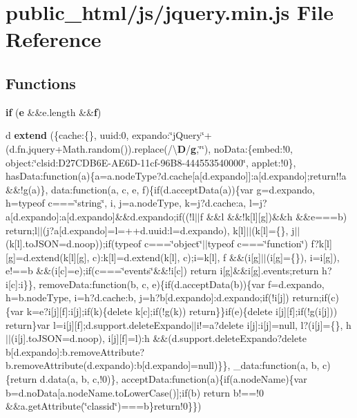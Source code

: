 \section{public\-\_\-html/js/jquery.min.\-js File Reference}
\label{jquery_8min_8js}
\subsection*{Functions}
\begin{DoxyCompactItemize}
\item 
{\bf if} ({\bf e} \&\&e.\-length \&\&{\bf f})
\item 
d {\bf extend} (\{cache\-:\{\}, uuid\-:0, expando\-:\char`\"{}j\-Query\char`\"{}+(d.\-fn.\-jquery+Math.\-random()).replace(/\textbackslash{}{\bf D}/{\bf g},\char`\"{}\char`\"{}), no\-Data\-:\{embed\-:!0, object\-:\char`\"{}clsid\-:\-D27\-C\-D\-B6\-E-\/A\-E6\-D-\/11cf-\/96\-B8-\/444553540000\char`\"{}, applet\-:!0\}, has\-Data\-:function(a)\{a=a.\-node\-Type?d.\-cache[a[d.\-expando]]\-:a[d.\-expando];return!!a \&\&!g(a)\}, data\-:function(a, c, e, f)\{if(d.\-accept\-Data(a))\{var g=d.\-expando, h=typeof c===\char`\"{}string\char`\"{}, i, j=a.\-node\-Type, k=j?d.\-cache\-:a, l=j?a[d.\-expando]\-:a[d.\-expando]\&\&d.\-expando;if((!l$|$$|$f \&\&l \&\&!k[l][g])\&\&h \&\&e===b) return;l$|$$|$(j?a[d.\-expando]=l=++d.\-uuid\-:l=d.\-expando), k[l]$|$$|$(k[l]=\{\}, j$|$$|$(k[l].\-to\-J\-S\-O\-N=d.\-noop));if(typeof c===\char`\"{}object\char`\"{}$|$$|$typeof c===\char`\"{}function\char`\"{}) f?k[l][g]=d.\-extend(k[l][g], c)\-:k[l]=d.\-extend(k[l], c);i=k[l], f \&\&(i[g]$|$$|$(i[g]=\{\}), i=i[g]), e!==b \&\&(i[c]=e);if(c===\char`\"{}events\char`\"{}\&\&!i[c]) return i[g]\&\&i[g].\-events;return h?i[c]\-:i\}\}, remove\-Data\-:function(b, c, e)\{if(d.\-accept\-Data(b))\{var f=d.\-expando, h=b.\-node\-Type, i=h?d.\-cache\-:b, j=h?b[d.\-expando]\-:d.\-expando;if(!i[j]) return;if(c)\{var k=e?i[j][f]\-:i[j];if(k)\{delete k[c];if(!g(k)) return\}\}if(e)\{delete i[j][f];if(!g(i[j])) return\}var l=i[j][f];d.\-support.\-delete\-Expando$|$$|$i!=a?delete i[j]\-:i[j]=null, l?(i[j]=\{\}, h$|$$|$(i[j].\-to\-J\-S\-O\-N=d.\-noop), i[j][f]=l)\-:h \&\&(d.\-support.\-delete\-Expando?delete b[d.\-expando]\-:b.\-remove\-Attribute?b.\-remove\-Attribute(d.\-expando)\-:b[d.\-expando]=null)\}\}, \-\_\-data\-:function(a, b, c)\{return d.\-data(a, b, c,!0)\}, accept\-Data\-:function(a)\{if(a.\-node\-Name)\{var b=d.\-no\-Data[a.\-node\-Name.\-to\-Lower\-Case()];if(b) return b!==!0 \&\&a.\-get\-Attribute(\char`\"{}classid\char`\"{})===b\}return!0\}\})

\end{DoxyCompactItemize}
